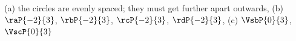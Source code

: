 (a) the circles are evenly spaced; they must get further apart outwards, (b) $\raP{-2}{3}$, $\rbP{-2}{3}$, $\rcP{-2}{3}$, $\rdP{-2}{3}$, (c) $\VsbP{0}{3}$, $\VscP{0}{3}$

